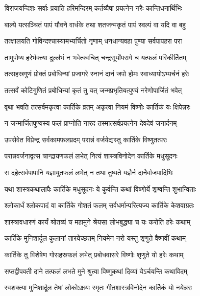 \twolineshloka
{विराजयन्दिशः सर्वाः प्रयाति हरिमन्दिरम्}
{कर्तव्यैषा प्रयत्नेन नरैः कान्तिधनार्थिभिः}%

\twolineshloka
{बाल्ये यत्सञ्चितं पापं यौवने वार्धके तथा}
{शतजन्मकृतं पापं स्वल्पं वा यदि वा बहु}%

\twolineshloka
{तत्क्षालयति गोविन्दश्चास्यामभ्यर्चितो नृणाम्}
{धनधान्यवहा पुण्या सर्वपापहरा परा}%

\twolineshloka
{तामुपोष्य हरेर्भक्त्या दुर्ल्लभं न भवेत्क्वचित्}
{चन्द्रसूर्योपरागे च यत्फलं परिकीर्तितम्}%

\twolineshloka
{तत्सहस्रगुणं प्रोक्तं प्रबोधिन्यां प्रजागरे}
{स्नानं दानं जपो होमः स्वाध्यायोऽभ्यर्चनं हरेः}%

\twolineshloka
{तत्सर्वं कोटिगुणितं प्रबोधिन्यां कृतं तु यत्}
{जन्मप्रभृतियत्पुण्यं नरेणोपार्जितं भवेत्}%

\twolineshloka
{वृथा भवति तत्सर्वमकृत्वा कार्तिके व्रतम्}
{अकृत्वा नियमं विष्णोः कार्तिकं यः क्षिपेन्नरः}%

\twolineshloka
{न जन्मार्जितपुण्यस्य फलं प्राप्नोति नारद}
{तस्मात्सर्वप्रयत्नेन देवदेवं जनार्दनम्}%

\twolineshloka
{उपसेवेत विप्रेन्द्र सर्वकामफलप्रदम्}
{परान्नं वर्जयेद्यस्तु कार्तिके विष्णुतत्परः}%

\twolineshloka
{परान्नवर्जनाद्वत्स चान्द्रायणफलं लभेत्}
{नित्यं शास्त्रविनोदेन कार्तिके मधुसूदनः}%

\twolineshloka
{स दहेत्सर्वपापानि यज्ञायुतफलं लभेत्}
{न तथा तुष्यते यज्ञैर्न दानैर्वाजपादिभिः}%

\twolineshloka
{यथा शास्त्रकथालापैः कार्तिके मधुसूदनः}
{ये कुर्वन्ति कथां विष्णोर्ये शृण्वन्ति शुभान्विताः}%

\twolineshloka
{श्लोकार्धं श्लोकपादं वा कार्तिके गोशतं फलम्}
{सर्वधर्मान्परित्यज्य कार्तिके केशवाग्रतः}%

\twolineshloka
{शास्त्रावधारणं कार्यं श्रोतव्यं च महामुने}
{श्रेयसा लोभबुद्ध्या च यः करोति हरेः कथाम्}%

\twolineshloka
{कार्तिके मुनिशार्दूल कुलानां तारयेच्छतम्}
{नियमेन नरो यस्तु शृणुते वैष्णवीं कथाम्}%

\twolineshloka
{कार्तिके तु विशेषेण गोसहस्रफलं लभेत्}
{प्रबोधवासरे विष्णोः शृणुते यो हरेः कथाम्}%

\twolineshloka
{सप्तद्वीपवती दाने तत्फलं लभते मुने}
{श्रुत्वा विष्णुकथां दिव्यां येऽर्चयन्ति कथाविदम्}%

\twolineshloka
{स्वशक्त्या मुनिशार्दूल तेषां लोकोऽक्षयः स्मृतः}
{गीतशास्त्रविनोदेन कार्तिकं यो नयेन्नरः}%

